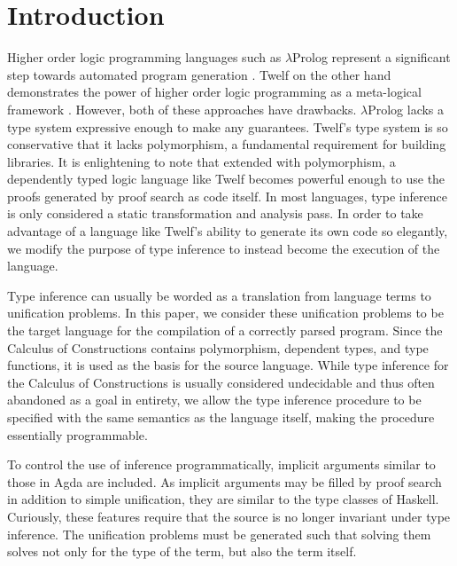\section{Introduction}

Higher order logic programming languages such as $\lambda$Prolog represent a significant step towards automated program generation \citep{miller1988overview}. 
Twelf on the other hand demonstrates the power of higher order logic programming as a meta-logical framework \citep{pfenning1999system}.  
However, both of these approaches have drawbacks.  
$\lambda$Prolog lacks a type system expressive enough to make any guarantees.  
Twelf's type system is so conservative that it lacks polymorphism, a fundamental requirement for building libraries.  
It is enlightening to note that extended with polymorphism, 
   a dependently typed logic language like Twelf becomes powerful enough to use the proofs generated by proof search as code itself.
In most languages, type inference is only considered a static transformation and analysis pass.  
In order to take advantage of a language like Twelf's ability to generate its own code so elegantly, 
   we modify the purpose of type inference to instead become the execution of the language.

Type inference can usually be worded as a translation from language terms to unification problems.
In this paper, we consider these unification problems to be the target language for the compilation of a correctly parsed program. 
Since the Calculus of Constructions \citep{coquand1986calculus} contains polymorphism, dependent types, and type functions, it is used as the basis for the source language. 
While type inference for the Calculus of Constructions is usually considered undecidable\citep{harper1991type} and thus often abandoned as a goal in entirety, 
   we allow the type inference procedure to be specified with the same semantics as the language itself, making the procedure essentially programmable. 

To control the use of inference programmatically, implicit arguments similar to those in Agda are included.  
As implicit arguments may be filled by proof search in addition to simple unification, they are similar to the type classes of Haskell. 
Curiously, these features require that the source is no longer invariant under type inference.  
The unification problems must be generated such that solving them solves not only for the type of the term, but also the term itself.
